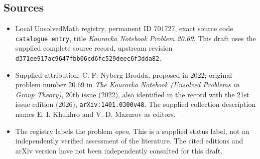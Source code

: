 \documentclass[11pt]{article}
\begin{document}
\subsection{Sources}
\begin{itemize}
\item Local UnsolvedMath registry, permanent ID \(701727\), exact source code \texttt{catalogue entry}, title \emph{Kourovka Notebook Problem 20.69}. This draft uses the supplied complete source record, upstream revision \texttt{d371ee917ac9647fbb06cd6fc529deec6f3dda82}.
\item Supplied attribution: C.-F. Nyberg-Brodda, proposed in 2022; original problem number 20.69 in \emph{The Kourovka Notebook (Unsolved Problems in Group Theory)}, 20th issue (2022), also identified in the record with the 21st issue edition (2026), \texttt{arXiv:1401.0300v48}. The supplied collection description names E. I. Khukhro and V. D. Mazurov as editors.
\item The registry labels the problem \emph{open}. This is a supplied status label, not an independently verified assessment of the literature. The cited editions and arXiv version have not been independently consulted for this draft.
\end{itemize}
\end{document}
